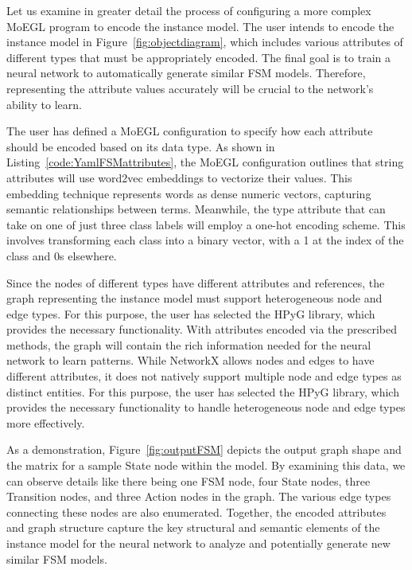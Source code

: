 \documentclass[journal,article,submit,moreauthors,technologies]{Definitions/mdpi}
\begin{document}
Let us examine in greater detail the process of configuring a more complex MoEGL program to encode the instance model. The user intends to encode the instance model in Figure~\ref{fig:objectdiagram}, which includes various attributes of different types that must be appropriately encoded. The final goal is to train a neural network to automatically generate similar FSM models. Therefore, representing the attribute values accurately will be crucial to the network's ability to learn.

The user has defined a MoEGL configuration to specify how each attribute should be encoded based on its data type. As shown in Listing~\ref{code:YamlFSMattributes}, the MoEGL configuration outlines that string attributes will use word2vec embeddings to vectorize their values. This embedding technique represents words as dense numeric vectors, capturing semantic relationships between terms. Meanwhile, the type attribute that can take on one of just three class labels will employ a one-hot encoding scheme. This involves transforming each class into a binary vector, with a 1 at the index of the class and 0s elsewhere.

Since the nodes of different types have different attributes and references, the graph representing the instance model must support heterogeneous node and edge types. For this purpose, the user has selected the HPyG library, which provides the necessary functionality. With attributes encoded via the prescribed methods, the graph will contain the rich information needed for the neural network to learn patterns. While NetworkX allows nodes and edges to have different attributes, it does not natively support multiple node and edge types as distinct entities. For this purpose, the user has selected the HPyG library, which provides the necessary functionality to handle heterogeneous node and edge types more effectively.


As a demonstration, Figure~\ref{fig:outputFSM} depicts the output graph shape and the matrix for a sample State node within the model. By examining this data, we can observe details like there being one FSM node, four State nodes, three Transition nodes, and three Action nodes in the graph. The various edge types connecting these nodes are also enumerated. Together, the encoded attributes and graph structure capture the key structural and semantic elements of the instance model for the neural network to analyze and potentially generate new similar FSM models.
\end{document}
